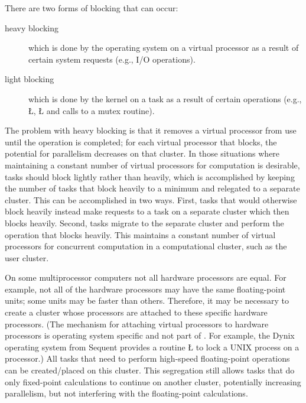 \documentclass[openright,twoside]{report}
\begin{document}
There are two forms of blocking that can occur:
\begin{description}
\item[heavy blocking]
which is done by the operating system on a virtual processor as a result of certain system requests (e.g., I/O operations).

\item[light blocking]
which is done by the \uC kernel on a task as a result of certain \uC operations (e.g., \LGinlinetrue\LGbegin\lgrinde\L{}\endlgrinde\LGend{}, \LGinlinetrue\LGbegin\lgrinde\L{}\endlgrinde\LGend{} and calls to a mutex routine).
\end{description}
The problem with heavy blocking is that it removes a virtual processor from use until the operation is completed;
for each virtual processor that blocks, the potential for parallelism decreases on that cluster.
In those situations where maintaining a constant number of virtual processors for computation is desirable, tasks should block lightly rather than heavily, which is accomplished by keeping the number of tasks that block heavily to a minimum and relegated to a separate cluster.
This can be accomplished in two ways.
First, tasks that would otherwise block heavily instead make requests to a task on a separate cluster which then blocks heavily.
Second, tasks migrate to the separate cluster and perform the operation that blocks heavily.
This maintains a constant number of virtual processors for concurrent computation in a computational cluster, such as the user cluster.

On some multiprocessor computers not all hardware processors are equal.
For example, not all of the hardware processors may have the same floating-point units;
some units may be faster than others.
Therefore, it may be necessary to create a cluster whose processors are attached to these specific hardware processors.
(The mechanism for attaching virtual processors to hardware processors is operating system specific and not part of \uC.
For example, the Dynix operating system from Sequent provides a routine \LGinlinetrue\LGbegin\lgrinde\L{}\endlgrinde\LGend{} to lock a UNIX process on a processor.)
All tasks that need to perform high-speed floating-point operations can be created/placed on this cluster.
This segregation still allows tasks that do only fixed-point calculations to continue on another cluster, potentially increasing parallelism, but not interfering with the floating-point calculations.
\end{document}
